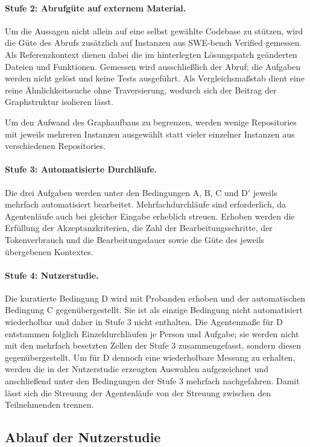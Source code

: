 \paragraph{Stufe 2: Abrufgüte auf externem Material.} Um die Aussagen nicht allein auf eine selbst gewählte Codebase zu stützen, wird die Güte des Abrufs zusätzlich auf Instanzen aus SWE-bench Verified gemessen. Als Referenzkontext dienen dabei die im hinterlegten Lösungspatch geänderten Dateien und Funktionen. Gemessen wird ausschließlich der Abruf; die Aufgaben werden nicht gelöst und keine Tests ausgeführt. Als Vergleichsmaßstab dient eine reine Ähnlichkeitssuche ohne Traversierung, wodurch sich der Beitrag der Graphstruktur isolieren lässt.

Um den Aufwand des Graphaufbaus zu begrenzen, werden wenige Repositories mit jeweils mehreren Instanzen ausgewählt statt vieler einzelner Instanzen aus verschiedenen Repositories.

\paragraph{Stufe 3: Automatisierte Durchläufe.} Die drei Aufgaben werden unter den Bedingungen A, B, C und D$'$ jeweils mehrfach automatisiert bearbeitet. Mehrfachdurchläufe sind erforderlich, da Agentenläufe auch bei gleicher Eingabe erheblich streuen. Erhoben werden die Erfüllung der Akzeptanzkriterien, die Zahl der Bearbeitungsschritte, der Tokenverbrauch und die Bearbeitungsdauer sowie die Güte des jeweils übergebenen Kontextes.

\paragraph{Stufe 4: Nutzerstudie.} Die kuratierte Bedingung D wird mit Probanden erhoben und der automatischen Bedingung C gegenübergestellt. Sie ist als einzige Bedingung nicht automatisiert wiederholbar und daher in Stufe 3 nicht enthalten. Die Agentenmaße für D entstammen folglich Einzeldurchläufen je Person und Aufgabe; sie werden nicht mit den mehrfach besetzten Zellen der Stufe 3 zusammengefasst, sondern diesen gegenübergestellt. Um für D dennoch eine wiederholbare Messung zu erhalten, werden die in der Nutzerstudie erzeugten Auswahlen aufgezeichnet und anschließend unter den Bedingungen der Stufe 3 mehrfach nachgefahren. Damit lässt sich die Streuung der Agentenläufe von der Streuung zwischen den Teilnehmenden trennen.

\subsection{Ablauf der Nutzerstudie}

